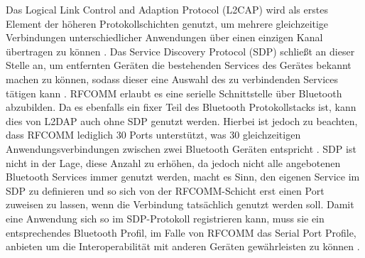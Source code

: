 	Das Logical Link Control and Adaption Protocol (L2CAP) wird als erstes Element der höheren Protokollschichten genutzt, um mehrere gleichzeitige Verbindungen unterschiedlicher Anwendungen über einen einzigen Kanal übertragen zu können \cite[S.395]{Sauter}. Das Service Discovery Protocol (SDP) schließt an dieser Stelle an, um entfernten Geräten die bestehenden Services des Gerätes bekannt machen zu können, sodass dieser eine Auswahl des zu verbindenden Services tätigen kann \cite[S.395]{morrow}. RFCOMM erlaubt es eine serielle Schnittstelle über Bluetooth abzubilden. Da es ebenfalls ein fixer Teil des Bluetooth Protokollstacks ist, kann dies von L2DAP auch ohne SDP genutzt werden. Hierbei ist jedoch zu beachten, dass RFCOMM lediglich 30 Ports unterstützt, was 30 gleichzeitigen Anwendungsverbindungen zwischen zwei Bluetooth Geräten entspricht \cite[S.398]{Sauter}. SDP ist nicht in der Lage, diese Anzahl zu erhöhen, da jedoch nicht alle angebotenen Bluetooth Services immer genutzt werden, macht es Sinn, den eigenen Service im SDP zu definieren und so sich von der RFCOMM-Schicht erst einen Port zuweisen zu lassen, wenn die Verbindung tatsächlich genutzt werden soll. Damit eine Anwendung sich so im SDP-Protokoll registrieren kann, muss sie ein entsprechendes Bluetooth Profil, im Falle von RFCOMM das Serial Port Profile, anbieten um die Interoperabilität mit anderen Geräten gewährleisten zu können \cite[S.411]{Sauter}.
	
